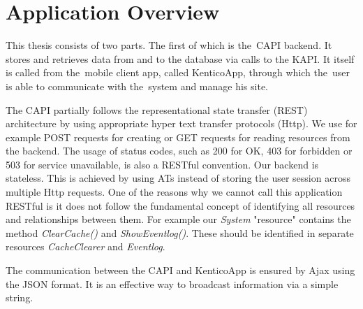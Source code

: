 \section{Application Overview}
This thesis consists of two parts. The first of which is the~CAPI backend. It stores and retrieves data from and to the database via calls to the KAPI. It itself is called from the~mobile client app, called KenticoApp, through which the~user is able to communicate with the~system and manage his site.

The CAPI partially follows the representational state transfer (REST) architecture by using appropriate hyper text transfer protocols (Http). We use for example POST requests for creating or GET requests for reading resources from the backend. The usage of status codes, such as 200 for OK, 403 for forbidden or 503 for service unavailable, is also a RESTful convention. Our backend is stateless. This is achieved by using ATs instead of storing the user session across multiple Http requests. One of the reasons why we cannot call this application RESTful is it does not follow the fundamental concept of identifying all resources and relationships between them. For example our \textit{System} "resource" contains the method \textit{ClearCache()} and \textit{ShowEventlog()}. These should be identified in separate resources \textit{CacheClearer} and \textit{Eventlog}.

The communication between the CAPI and KenticoApp is ensured by Ajax using the JSON format. It is an effective way to broadcast information via a simple string.

